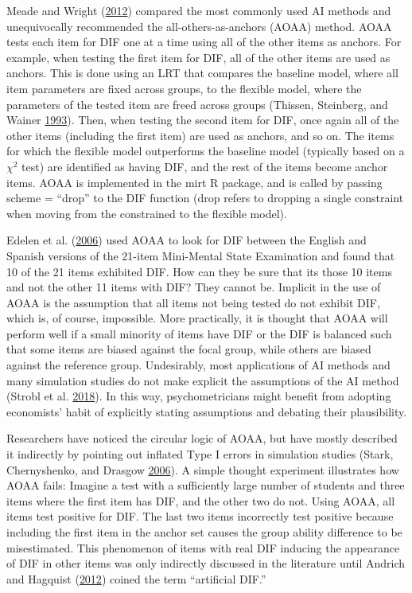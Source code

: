 \documentclass[
  11pt,
]{article}
\begin{document}
Meade and Wright (\protect\hyperlink{ref-meade2012solving}{2012}) compared the most commonly used AI methods and unequivocally recommended the all-others-as-anchors (AOAA) method. AOAA tests each item for DIF one at a time using all of the other items as anchors. For example, when testing the first item for DIF, all of the other items are used as anchors. This is done using an LRT that compares the baseline model, where all item parameters are fixed across groups, to the flexible model, where the parameters of the tested item are freed across groups (Thissen, Steinberg, and Wainer \protect\hyperlink{ref-thissen1993detection}{1993}). Then, when testing the second item for DIF, once again all of the other items (including the first item) are used as anchors, and so on. The items for which the flexible model outperforms the baseline model (typically based on a \(\chi^2\) test) are identified as having DIF, and the rest of the items become anchor items. AOAA is implemented in the mirt R package, and is called by passing scheme = \enquote{drop} to the DIF function (drop refers to dropping a single constraint when moving from the constrained to the flexible model).

Edelen et al. (\protect\hyperlink{ref-edelen2006identification}{2006}) used AOAA to look for DIF between the English and Spanish versions of the 21-item Mini-Mental State Examination and found that 10 of the 21 items exhibited DIF. How can they be sure that its those 10 items and not the other 11 items with DIF? They cannot be. Implicit in the use of AOAA is the assumption that all items not being tested do not exhibit DIF, which is, of course, impossible. More practically, it is thought that AOAA will perform well if a small minority of items have DIF or the DIF is balanced such that some items are biased against the focal group, while others are biased against the reference group. Undesirably, most applications of AI methods and many simulation studies do not make explicit the assumptions of the AI method (Strobl et al. \protect\hyperlink{ref-strobl2018anchor}{2018}). In this way, psychometricians might benefit from adopting economists' habit of explicitly stating assumptions and debating their plausibility.

Researchers have noticed the circular logic of AOAA, but have mostly described it indirectly by pointing out inflated Type I errors in simulation studies (Stark, Chernyshenko, and Drasgow \protect\hyperlink{ref-stark2006detecting}{2006}). A simple thought experiment illustrates how AOAA fails: Imagine a test with a sufficiently large number of students and three items where the first item has DIF, and the other two do not. Using AOAA, all items test positive for DIF. The last two items incorrectly test positive because including the first item in the anchor set causes the group ability difference to be misestimated. This phenomenon of items with real DIF inducing the appearance of DIF in other items was only indirectly discussed in the literature until Andrich and Hagquist (\protect\hyperlink{ref-andrich2012real}{2012}) coined the term \enquote{artificial DIF.}
\end{document}
